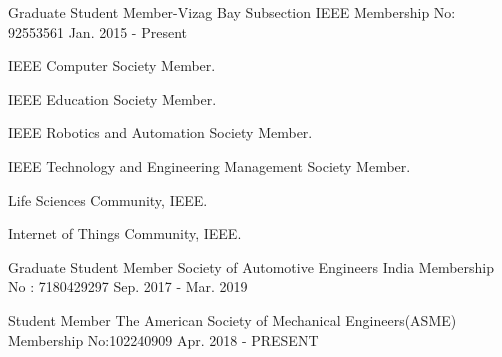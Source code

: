 \begin{cventries}
  \cventry
    {Graduate Student Member-Vizag Bay Subsection}
    {IEEE}
    {Membership No: 92553561}
    {Jan. 2015 - Present}
    {
      \begin{cvitems}
        \item {IEEE Computer Society Member.}
        \item {IEEE Education Society Member.}
        \item {IEEE Robotics and Automation Society Member.}
        \item {IEEE Technology and Engineering Management Society Member.}
        \item {Life Sciences Community, IEEE.}
        \item {Internet of Things Community, IEEE.}
      \end{cvitems}
    }
  \cventry
    {Graduate Student Member}
    {Society of Automotive Engineers India}
    {Membership No : 7180429297}
    {Sep. 2017 - Mar. 2019}
{
 \begin{cvitems}
\end{cvitems}
}
  \cventry
    {Student Member}
    {The American Society of Mechanical Engineers(ASME)}
    {Membership No:102240909}
    {Apr. 2018 - PRESENT}
{
 \begin{cvitems}
    \end{cvitems}
}
\end{cventries}
